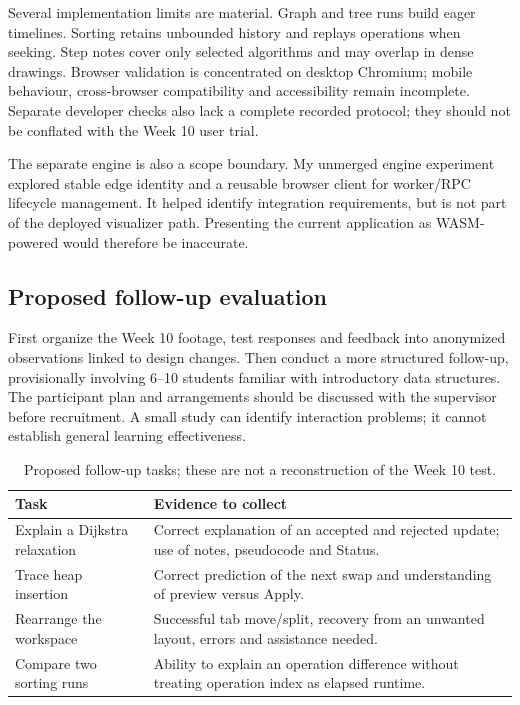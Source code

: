 \documentclass[11pt,a4paper]{article}
\begin{document}
Several implementation limits are material. Graph and tree runs build eager timelines. Sorting retains unbounded history and replays operations when seeking. Step notes cover only selected algorithms and may overlap in dense drawings. Browser validation is concentrated on desktop Chromium; mobile behaviour, cross-browser compatibility and accessibility remain incomplete. Separate developer checks also lack a complete recorded protocol; they should not be conflated with the Week 10 user trial.

The separate engine is also a scope boundary. My unmerged engine experiment explored stable edge identity and a reusable browser client for worker/RPC lifecycle management. It helped identify integration requirements, but is not part of the deployed visualizer path. Presenting the current application as WASM-powered would therefore be inaccurate.

\subsection{Proposed follow-up evaluation}
First organize the Week 10 footage, test responses and feedback into anonymized observations linked to design changes. Then conduct a more structured follow-up, provisionally involving 6--10 students familiar with introductory data structures. The participant plan and arrangements should be discussed with the supervisor before recruitment. A small study can identify interaction problems; it cannot establish general learning effectiveness.

\begin{table}[H]\small\centering
\caption{Proposed follow-up tasks; these are not a reconstruction of the Week 10 test.}
\begin{tabularx}{\linewidth}{@{}p{41mm}X@{}}\toprule
Task & Evidence to collect\\\midrule
Explain a Dijkstra relaxation & Correct explanation of an accepted and rejected update; use of notes, pseudocode and Status.\\
Trace heap insertion & Correct prediction of the next swap and understanding of preview versus Apply.\\
Rearrange the workspace & Successful tab move/split, recovery from an unwanted layout, errors and assistance needed.\\
Compare two sorting runs & Ability to explain an operation difference without treating operation index as elapsed runtime.\\\bottomrule
\end{tabularx}
\end{table}
\end{document}
